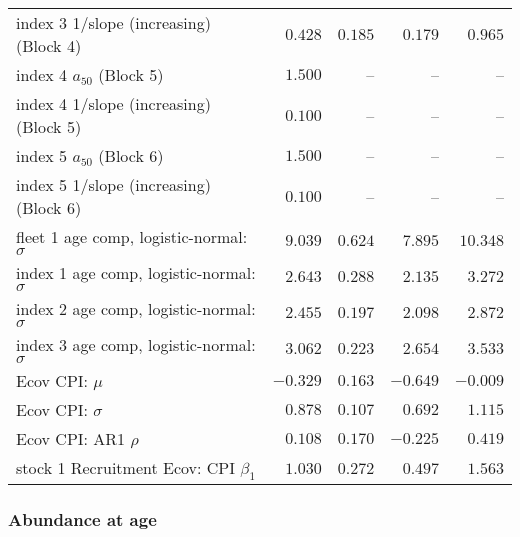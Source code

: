 \documentclass[
]{article}
\begin{document}
\begin{landscape}
\begin{longtable}[t]{lrrrr}
index 3 1/slope (increasing) (Block 4) & $0.428$ & $0.185$ & $0.179$ & $0.965$\\
index 4 $a_{50}$ (Block 5) & $1.500$ & -- & -- & --\\
index 4 1/slope (increasing) (Block 5) & $0.100$ & -- & -- & --\\
index 5 $a_{50}$ (Block 6) & $1.500$ & -- & -- & --\\
\addlinespace
index 5 1/slope (increasing) (Block 6) & $0.100$ & -- & -- & --\\
fleet 1 age comp, logistic-normal: $\sigma$ & $9.039$ & $0.624$ & $7.895$ & $10.348$\\
index 1 age comp, logistic-normal: $\sigma$ & $2.643$ & $0.288$ & $2.135$ & $3.272$\\
index 2 age comp, logistic-normal: $\sigma$ & $2.455$ & $0.197$ & $2.098$ & $2.872$\\
index 3 age comp, logistic-normal: $\sigma$ & $3.062$ & $0.223$ & $2.654$ & $3.533$\\
\addlinespace
Ecov CPI: $\mu$ & $-0.329$ & $0.163$ & $-0.649$ & $-0.009$\\
Ecov CPI: $\sigma$ & $0.878$ & $0.107$ & $0.692$ & $1.115$\\
Ecov CPI: AR1 $\rho$ & $0.108$ & $0.170$ & $-0.225$ & $0.419$\\
stock 1 Recruitment Ecov: CPI $\beta_1$ & $1.030$ & $0.272$ & $0.497$ & $1.563$\\*
\end{longtable}
\end{landscape}

\subsubsection{Abundance at age}\label{abundance-at-age}
\end{document}
